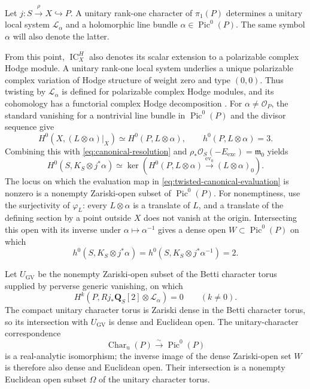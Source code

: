 \documentclass[10pt]{amsart}
\numberwithin{equation}{section}
\theoremstyle{definition}
\theoremstyle{remark}
\newcommand{\QQ}{\mathbf Q}
\newcommand{\IC}{\operatorname{IC}}
\newcommand{\exc}{\mathrm{exc}}
\begin{document}
Let $j:S\xrightarrow{\rho}X\hookrightarrow P$.  A unitary rank-one character
of $\pi_1(P)$ determines a unitary local system $\mathcal L_\alpha$ and a
holomorphic line bundle $\alpha\in\operatorname{Pic}^0(P)$.  The same symbol $\alpha$ will also denote the latter.

From this point, $\IC_X^H$ also denotes its scalar extension to a polarizable
complex Hodge module.  A unitary rank-one local system underlies a unique
polarizable complex variation of Hodge structure of weight zero and type
$(0,0)$.  Thus twisting by $\mathcal L_\alpha$ is defined for polarizable
complex Hodge modules, and its cohomology has a functorial complex Hodge
decomposition \cite[Sections~2.1 and~2.5]{KLM2026}.
For $\alpha\ne\mathcal O_P$, the standard vanishing for a nontrivial
line bundle in $\operatorname{Pic}^0(P)$ and the divisor sequence give
\[
 H^0(X,(L\otimes\alpha)|_X)\simeq H^0(P,L\otimes\alpha),
 \qquad h^0(P,L\otimes\alpha)=3.
\]
Combining this with \eqref{eq:canonical-resolution} and
$\rho_*\mathcal O_S(-E_{\exc})=\mathfrak m_0$ yields
\begin{equation}
 H^0(S,K_S\otimes j^*\alpha)
 \simeq
 \ker\!\left(
 H^0(P,L\otimes\alpha)\xrightarrow{\operatorname{ev}_0}
 (L\otimes\alpha)_0\right).
\label{eq:twisted-canonical-evaluation}
\end{equation}
The locus on which the evaluation map in
\eqref{eq:twisted-canonical-evaluation} is nonzero is a nonempty Zariski-open
subset of $\operatorname{Pic}^0(P)$.  For nonemptiness, use the
surjectivity of $\varphi_L$: every $L\otimes\alpha$ is a translate of $L$,
and a translate of the defining section by a point outside $X$ does not
vanish at the origin.  Intersecting this open with its inverse under
$\alpha\mapsto\alpha^{-1}$ gives a dense open $W\subset\operatorname{Pic}^0(P)$
on which
\begin{equation}
 h^0(S,K_S\otimes j^*\alpha)
 =h^0(S,K_S\otimes j^*\alpha^{-1})=2.
\label{eq:twisted-outer-hodge}
\end{equation}

Let $U_{\mathrm{GV}}$ be the nonempty Zariski-open subset of the Betti
character torus supplied by perverse generic vanishing, on which
\[
 H^k(P,Rj_*\QQ_S[2]\otimes\mathcal L_\alpha)=0\qquad(k\ne0).
\]
The compact unitary character torus is Zariski dense in the Betti character
torus, so its intersection with $U_{\mathrm{GV}}$ is dense and Euclidean
open.  The unitary-character correspondence
\[
 \operatorname{Char}_{\mathrm u}(P)\xrightarrow{\sim}
 \operatorname{Pic}^0(P)
\]
is a real-analytic isomorphism; the inverse image of the dense Zariski-open
set $W$ is therefore also dense and Euclidean open.  Their intersection is a
nonempty Euclidean open subset $\Omega$ of the unitary character torus.
\end{document}

